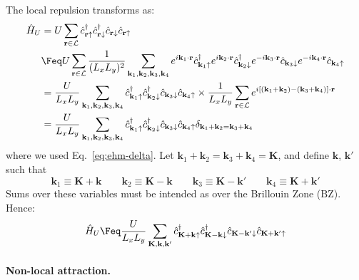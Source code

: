 The local repulsion transforms as:
\[
\begin{aligned}
	\hat H_U &= U \sum_{\mathbf{r}\in\mathcal{L}} \hat c_{\mathbf{r}\uparrow}^\dagger \hat c_{\mathbf{r}\downarrow}^\dagger \hat c_{\mathbf{r}\downarrow} \hat c_{\mathbf{r}\uparrow} \\
	&\Feq U \sum_{\mathbf{r}\in\mathcal{L}} \frac{1}{(L_x L_y)^2} \sum_{\mathbf{k}_1,\mathbf{k}_2,\mathbf{k}_3,\mathbf{k}_4} e^{i \mathbf{k}_1 \cdot \mathbf{r}} \hat c_{\mathbf{k}_1 \uparrow}^\dagger e^{i \mathbf{k}_2 \cdot \mathbf{r}} \hat c_{\mathbf{k}_2 \downarrow}^\dagger e^{-i \mathbf{k}_3 \cdot \mathbf{r}} \hat c_{\mathbf{k}_3 \downarrow} e^{-i \mathbf{k}_4 \cdot \mathbf{r}} \hat c_{\mathbf{k}_4 \uparrow} \\
	&= \frac{U}{L_x L_y} \sum_{\mathbf{k}_1,\mathbf{k}_2,\mathbf{k}_3,\mathbf{k}_4} \hat c_{\mathbf{k}_1 \uparrow}^\dagger \hat c_{\mathbf{k}_2 \downarrow}^\dagger \hat c_{\mathbf{k}_3 \downarrow} \hat c_{\mathbf{k}_4 \uparrow} \times \frac{1}{L_x L_y} \sum_{\mathbf{r}\in\mathcal{L}} e^{i \left[ (\mathbf{k}_1 + \mathbf{k}_2) - (\mathbf{k}_3 + \mathbf{k}_4) \right] \cdot \mathbf{r}} \\
	&= \frac{U}{L_x L_y} \sum_{\mathbf{k}_1,\mathbf{k}_2,\mathbf{k}_3,\mathbf{k}_4} \hat c_{\mathbf{k}_1 \uparrow}^\dagger \hat c_{\mathbf{k}_2 \downarrow}^\dagger \hat c_{\mathbf{k}_3 \downarrow} \hat c_{\mathbf{k}_4 \uparrow} \delta_{\mathbf{k}_1+\mathbf{k}_2 = \mathbf{k}_3+\mathbf{k}_4}
\end{aligned}
\]
where we used Eq.~\eqref{eq:ehm-delta}. Let $\mathbf{k}_1 + \mathbf{k}_2 = \mathbf{k}_3 + \mathbf{k}_4 = \mathbf{K}$, and define $\mathbf{k}$, $\mathbf{k}'$ such that
\[
	\mathbf{k}_1 \equiv \mathbf{K} + \mathbf{k}
	\qquad
	\mathbf{k}_2 \equiv \mathbf{K} - \mathbf{k}
	\qquad
	\mathbf{k}_3 \equiv \mathbf{K} - \mathbf{k}'
	\qquad
	\mathbf{k}_4 \equiv \mathbf{K} + \mathbf{k}'
\]
Sums over these variables must be intended as over the Brillouin Zone ($\mathrm{BZ}$). Hence:
\begin{equation}
	\hat H_U \Feq \frac{U}{L_x L_y}
	\sum_{\mathbf{K}, \mathbf{k}, \mathbf{k}'} \hat c_{\mathbf{K}+\mathbf{k} \uparrow}^\dagger \hat c_{\mathbf{K}-\mathbf{k} \downarrow}^\dagger \hat c_{\mathbf{K}-\mathbf{k}' \downarrow} \hat c_{\mathbf{K}+\mathbf{k}' \uparrow}
\end{equation}


\paragraph{Non-local attraction.} 

